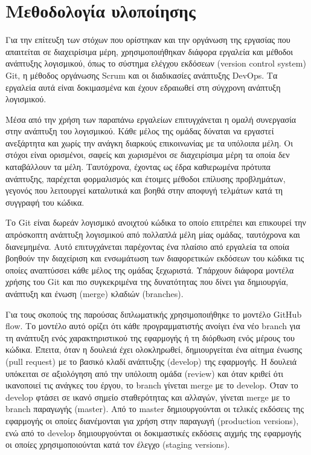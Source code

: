 \section{Μεθοδολογία υλοποίησης} \label{subsection:4-1-implementation-methodology}

Για την επίτευξη των στόχων που ορίστηκαν και την οργάνωση της εργασίας που απαιτείται σε διαχειρίσιμα μέρη, χρησιμοποιήθηκαν διάφορα εργαλεία και μέθοδοι ανάπτυξης λογισμικού, όπως το σύστημα ελέγχου εκδόσεων (version control system) Git, η μέθοδος οργάνωσης Scrum και οι διαδικασίες ανάπτυξης DevOps. Τα εργαλεία αυτά είναι δοκιμασμένα και έχουν εδραιωθεί στη σύγχρονη ανάπτυξη λογισμικού.

Μέσα από την χρήση των παραπάνω εργαλείων επιτυγχάνεται η ομαλή συνεργασία στην ανάπτυξη του λογισμικού. Κάθε μέλος της ομάδας δύναται να εργαστεί ανεξάρτητα και χωρίς την ανάγκη διαρκούς επικοινωνίας με τα υπόλοιπα μέλη. Οι στόχοι είναι ορισμένοι, σαφείς και χωρισμένοι σε διαχειρίσιμα μέρη τα οποία δεν καταβάλλουν τα μέλη. Ταυτόχρονα, έχοντας ως έδρα καθιερωμένα πρότυπα ανάπτυξης, παρέχεται φορμαλισμός και έτοιμες μέθοδοι επίλυσης προβλημάτων, γεγονός που λειτουργεί καταλυτικά και βοηθά στην αποφυγή τελμάτων κατά τη συγγραφή του κώδικα.

Το Git είναι δωρεάν λογισμικό ανοιχτού κώδικα το οποίο επιτρέπει και επικουρεί την απρόσκοπτη ανάπτυξη λογισμικού από πολλαπλά μέλη μίας ομάδας, ταυτόχρονα και διανεμημένα. Αυτό επιτυγχάνεται παρέχοντας ένα πλαίσιο από εργαλεία τα οποία βοηθούν την διαχείριση και ενσωμάτωση των διαφορετικών εκδόσεων του κώδικα τις οποίες αναπτύσσει κάθε μέλος της ομάδας ξεχωριστά. Υπάρχουν διάφορα μοντέλα χρήσης του Git και πιο συγκεκριμένα της δυνατότητας που δίνει για δημιουργία, ανάπτυξη και ένωση (merge) κλαδιών (branches).

Για τους σκοπούς της παρούσας διπλωματικής χρησιμοποιήθηκε το μοντέλο GitHub flow\cite{4.1-github-flow}. Το μοντέλο αυτό ορίζει ότι κάθε προγραμματιστής ανοίγει ένα νέο branch για τη ανάπτυξη ενός χαρακτηριστικού της εφαρμογής ή τη διόρθωση ενός μέρους του κώδικα. Έπειτα, όταν η δουλειά έχει ολοκληρωθεί, δημιουργείται ένα αίτημα ένωσης (pull request) με το βασικό κλαδί ανάπτυξης (develop) της εφαρμογής. Η δουλειά υπόκειται σε αξιολόγηση από την υπόλοιπη ομάδα (review) και όταν κριθεί ότι ικανοποιεί τις ανάγκες του έργου, το branch γίνεται merge με το develop. Όταν το develop φτάσει σε ικανό σημείο σταθερότητας και αλλαγών, γίνεται merge με το branch παραγωγής (master). Από το master δημιουργούνται οι τελικές εκδόσεις της εφαρμογής οι οποίες διανέμονται για χρήση στην παραγωγή (production versions), ενώ από το develop δημιουργούνται οι δοκιμαστικές εκδόσεις αιχμής της εφαρμογής οι οποίες χρησιμοποιούνται κατά τον έλεγχο (staging versions).

